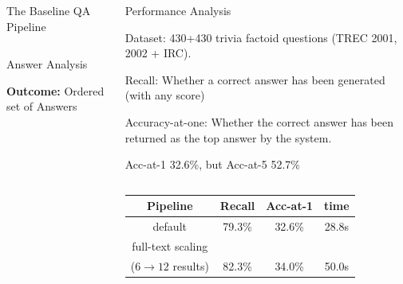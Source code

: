 \documentclass[xcolor=table]{beamer}
\begin{document}
\begin{frame}[fragile]{}
\begin{columns}[t]
\begin{block}{The Baseline QA Pipeline}
\begin{columns}[t]
\begin{block}{Answer Analysis}
\begin{multicols}{2}
	\centering
\colorbox{green!30!white}{\textbf{Outcome:} Ordered set of Answers}%
\end{multicols}
\end{block}
      \end{columns}


    \end{block}

    \begin{block}{Performance Analysis}
      \begin{multicols}{2}
	\setlength{\parskip}{1ex}

	Dataset: 430+430 trivia factoid questions (TREC 2001, 2002 + IRC).

\alert{Recall:} Whether a correct answer has been generated
(with any score)

\alert{Accuracy-at-one:} Whether the
correct answer has been returned as the top answer by the system.

\alert{Acc-at-1} 32.6\%, but \alert{Acc-at-5} 52.7\%

      \end{multicols}

      \begin{columns}[t]


\renewcommand{\arraystretch}{1.3}
\renewcommand{\tabcolsep}{0.5em}
\begin{tabular}{|c|ccc|}
\hline
Pipeline & Recall & Acc-at-1 & time \\ \hline \hline
	\rowcolor{purple!20}%
default & 79.3\% & 32.6\% & 28.8s \\
\hline
full-text scaling & & & \\
($6\to12$ results) & 82.3\% & 34.0\% & 50.0s \\


\end{tabular}
\end{columns}
\end{block}
\end{columns}
\end{frame}
\end{document}

